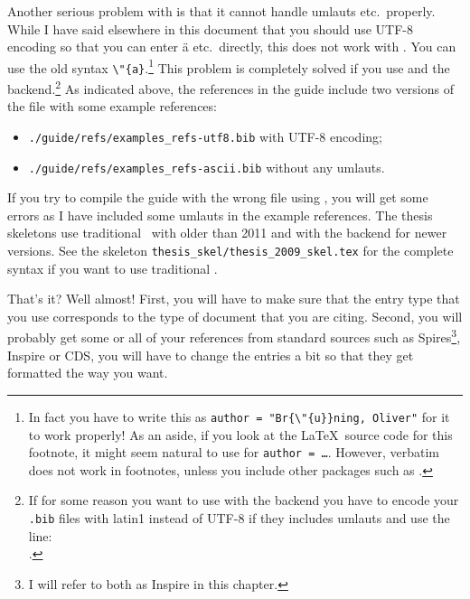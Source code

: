 Another serious problem with \BibTeX{} is that it cannot handle
umlauts etc.\ properly. While I have said elsewhere in this document
that you should use UTF-8 encoding so that you can enter ä
etc.\ directly, this does not work with \BibTeX. You can use the
old syntax \verb+\"{a}+.\footnote{%
  In fact you have to write this as \texttt{author = "Br\{\textbackslash"\{u\}\}ning, Oliver"} for it to work properly! %
  As an aside, if you look at the \LaTeX\ source code for this footnote,
  it might seem natural to use  for \texttt{author = \dots}.
  However, verbatim does not work in footnotes,
  unless you include other packages such as .}
This problem is completely solved if you use
 and the  backend.\footnote{%
If for some reason you want to use  with the  backend
you have to encode your \texttt{.bib}
files with latin1 instead of UTF-8 if they includes umlauts and use the line:\\
.}
As indicated above, the references in the guide include two versions of the file with some example references:
\begin{itemize}
\setlength{\parskip}{0pt}\setlength{\itemsep}{0pt}
\item \texttt{./guide/refs/examples\_refs-utf8.bib} with UTF-8 encoding;
\item \texttt{./guide/refs/examples\_refs-ascii.bib} without any umlauts.
\end{itemize}
If you try to compile the guide with the wrong file using \BibTeX, you
will get some errors as I have included some umlauts in the example
references.
The thesis skeletons use traditional \BibTeX\ with \TeXLive older than 2011
and  with the  backend for newer versions.
See the skeleton \texttt{thesis\_skel/thesis\_2009\_skel.tex} for the complete syntax
if you want to use traditional \BibTeX.

That's it? Well almost! First, you will have to make sure that the
entry type that you use corresponds to the type of document that you
are citing. Second, you will probably get some or all of your
references from standard sources such as Spires\footnote{I
  will refer to both as Inspire in this chapter.}, Inspire or CDS, you will have
to change the entries a bit so that they get formatted the way you want.


